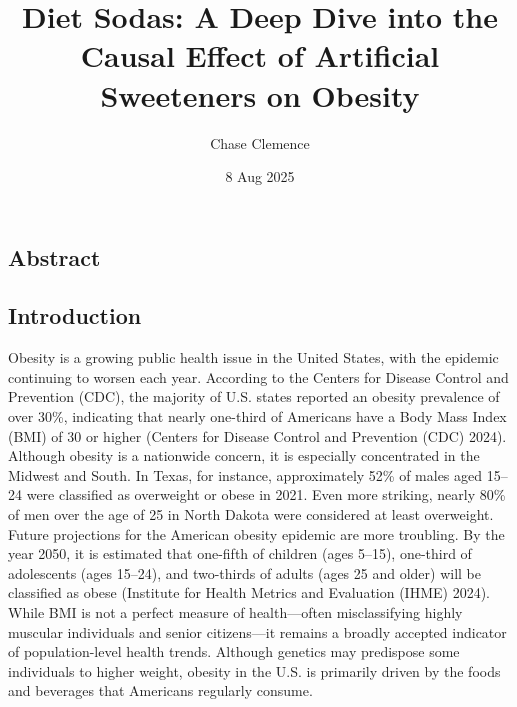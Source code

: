 \documentclass[
  11pt,
]{article}
\title{Diet Sodas: A Deep Dive into the Causal Effect of Artificial
Sweeteners on Obesity}
\author{Chase Clemence}
\date{8 Aug 2025}
\renewcommand*\contentsname{Table of contents}
\newcommand\contentsname{Table of contents}
\begin{document}
\maketitle

\renewcommand*\contentsname{Table of contents}
{
\hypersetup{linkcolor=}
\setcounter{tocdepth}{2}
\tableofcontents
}

\subsection{Abstract}\label{abstract}

\subsection{Introduction}\label{introduction}

Obesity is a growing public health issue in the United States, with the
epidemic continuing to worsen each year. According to the Centers for
Disease Control and Prevention (CDC), the majority of U.S. states
reported an obesity prevalence of over 30\%, indicating that nearly
one-third of Americans have a Body Mass Index (BMI) of 30 or higher
(Centers for Disease Control and Prevention (CDC) 2024). Although
obesity is a nationwide concern, it is especially concentrated in the
Midwest and South. In Texas, for instance, approximately 52\% of males
aged 15--24 were classified as overweight or obese in 2021. Even more
striking, nearly 80\% of men over the age of 25 in North Dakota were
considered at least overweight. Future projections for the American
obesity epidemic are more troubling. By the year 2050, it is estimated
that one-fifth of children (ages 5--15), one-third of adolescents (ages
15--24), and two-thirds of adults (ages 25 and older) will be classified
as obese (Institute for Health Metrics and Evaluation (IHME) 2024).
While BMI is not a perfect measure of health---often misclassifying
highly muscular individuals and senior citizens---it remains a broadly
accepted indicator of population-level health trends. Although genetics
may predispose some individuals to higher weight, obesity in the U.S. is
primarily driven by the foods and beverages that Americans regularly
consume.
\end{document}
